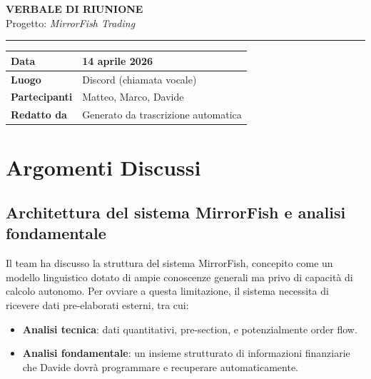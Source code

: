 \documentclass[12pt, a4paper]{article}
\begin{document}
\begin{center}
  {\LARGE\bfseries\color{primary} VERBALE DI RIUNIONE}\\[0.4cm]
  {\large Progetto: \textit{MirrorFish Trading}}\\[0.2cm]
  \textcolor{darkgray}{\rule{0.6\textwidth}{0.4pt}}
\end{center}

\vspace{0.5cm}

\begin{center}
\begin{tabular}{>{\bfseries}p{4cm} p{9cm}}
\toprule
Data & 14 aprile 2026 \\
\midrule
Luogo & Discord (chiamata vocale) \\
\midrule
Partecipanti & Matteo, Marco, Davide \\
\midrule
Redatto da & Generato da trascrizione automatica \\
\bottomrule
\end{tabular}
\end{center}

\vspace{0.8cm}

\section{Argomenti Discussi}

\subsection{Architettura del sistema MirrorFish e analisi fondamentale}

Il team ha discusso la struttura del sistema MirrorFish, concepito come un modello linguistico dotato di ampie conoscenze generali ma privo di capacità di calcolo autonomo. Per ovviare a questa limitazione, il sistema necessita di ricevere dati pre-elaborati esterni, tra cui:

\begin{itemize}[leftmargin=1.5cm]
  \item \textbf{Analisi tecnica}: dati quantitativi, pre-section, e potenzialmente order flow.
  \item \textbf{Analisi fondamentale}: un insieme strutturato di informazioni finanziarie che Davide dovrà programmare e recuperare automaticamente.
\end{itemize}
\end{document}
